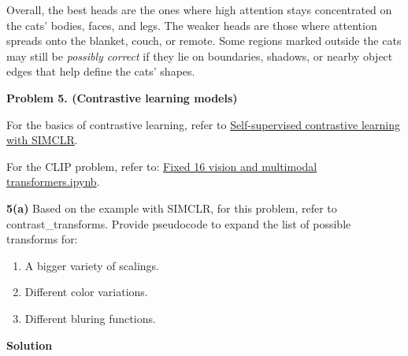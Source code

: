 \documentclass[10pt]{article}
\begin{document}
Overall, the best heads are the ones where high attention stays concentrated on the cats’ bodies, faces, and legs. The weaker heads are those where attention spreads onto the blanket, couch, or remote. Some regions marked outside the cats may still be \emph{possibly correct} if they lie on boundaries, shadows, or nearby object edges that help define the cats’ shapes.

\newpage

\textbf{Problem 5. (Contrastive learning models)}

For the basics of contrastive learning, refer to \href{https://lightning.ai/docs/pytorch/1.8.1/notebooks/course_UvA-DL/13-contrastive-learning.html}{Self-supervised contrastive learning with SIMCLR}.

For the CLIP problem, refer to: \href{https://colab.research.google.com/drive/1gFiqft0ngNU7nIxpqfbfJ94XhnSdju5u?usp=sharing}{Fixed 16 vision and multimodal transformers.ipynb}.

\textbf{5(a)} Based on the example with SIMCLR, for this problem, refer to contrast\_transforms. Provide pseudocode to expand the list of possible transforms for:

\begin{enumerate}[label=\roman*.]
    \item A bigger variety of scalings.
    \item Different color variations.
    \item Different bluring functions.
\end{enumerate}

\textbf{Solution}
\end{document}
